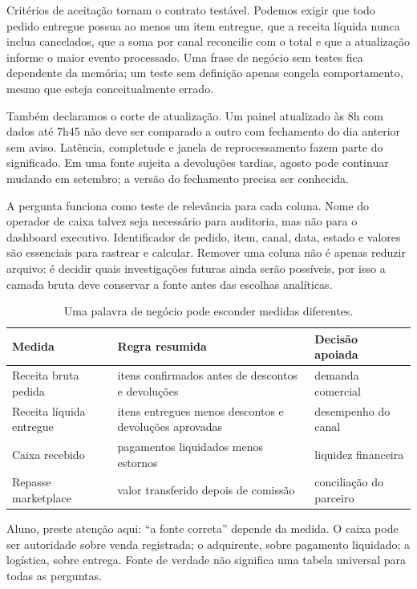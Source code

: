 Critérios de aceitação tornam o contrato testável. Podemos exigir que todo pedido entregue possua ao menos um item entregue, que a receita líquida nunca inclua cancelados, que a soma por canal reconcilie com o total e que a atualização informe o maior evento processado. Uma frase de negócio sem testes fica dependente da memória; um teste sem definição apenas congela comportamento, mesmo que esteja conceitualmente errado.

Também declaramos o corte de atualização. Um painel atualizado às 8h com dados até 7h45 não deve ser comparado a outro com fechamento do dia anterior sem aviso. Latência, completude e janela de reprocessamento fazem parte do significado. Em uma fonte sujeita a devoluções tardias, agosto pode continuar mudando em setembro; a versão do fechamento precisa ser conhecida.

A pergunta funciona como teste de relevância para cada coluna. Nome do operador de caixa talvez seja necessário para auditoria, mas não para o dashboard executivo. Identificador de pedido, item, canal, data, estado e valores são essenciais para rastrear e calcular. Remover uma coluna não é apenas reduzir arquivo: é decidir quais investigações futuras ainda serão possíveis, por isso a camada bruta deve conservar a fonte antes das escolhas analíticas.

\begin{table}[htbp]
\centering
\small
\caption{Uma palavra de negócio pode esconder medidas diferentes.}
\label{tab:receitas-definicoes}
\begin{tabularx}{0.95\textwidth}{@{}p{3.0cm}YY@{}}
\toprule
\textbf{Medida} & \textbf{Regra resumida} & \textbf{Decisão apoiada} \\
\midrule
Receita bruta pedida & itens confirmados antes de descontos e devoluções & demanda comercial \\
Receita líquida entregue & itens entregues menos descontos e devoluções aprovadas & desempenho do canal \\
Caixa recebido & pagamentos liquidados menos estornos & liquidez financeira \\
Repasse marketplace & valor transferido depois de comissão & conciliação do parceiro \\
\bottomrule
\end{tabularx}
\end{table}

\begin{GuidedBox}
Aluno, preste atenção aqui: ``a fonte correta'' depende da medida. O caixa pode ser autoridade sobre venda registrada; o adquirente, sobre pagamento liquidado; a logística, sobre entrega. Fonte de verdade não significa uma tabela universal para todas as perguntas.
\end{GuidedBox}

